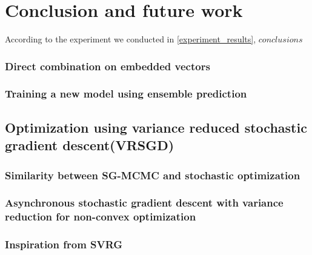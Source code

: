 \section{Conclusion and future work}
According to the experiment we conducted in \ref{experiment_results}, $conclusions$

\subsubsection{Direct combination on embedded vectors}

\subsubsection{Training a new model using ensemble prediction}

\subsection{Optimization using variance reduced stochastic gradient descent(VRSGD)}
\subsubsection{Similarity between SG-MCMC and stochastic optimization}
\subsubsection{Asynchronous stochastic gradient descent with variance reduction for non-convex optimization}
\subsubsection{Inspiration from SVRG}
